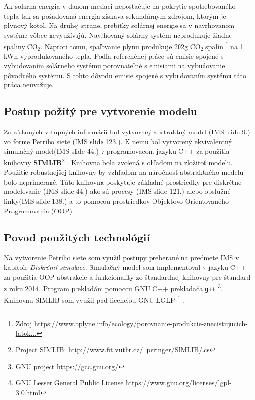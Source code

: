 \documentclass[a4paper, 11pt]{article}
\begin{document}
Ak solárna energia v danom mesiaci nepostačuje na pokrytie spotrebovaného tepla tak sa požadovaná energia získava sekundárnym zdrojom, ktorým je plynový kotol. Na druhej strane, prebitky solárnej energie sa v navrhovanom systéme vôbec nevyužívajú. Navrhovaný solárny systém neprodukuje žiadne spaliny CO$_2$. Naproti tomu, spaľovanie plynu produkuje 202g CO$_2$ spalín \footnote{Zdroj \href{https://www.oplyne.info/ecology/porovnanie-produkcie-znecistujucich-latok-so2-tzl-nox-co-a-sklenikoveho-plynu-co2-vyprodukovanych-spalinami-v-rodinnom-dome-vykurovanie-drevom-ciernym-hnedym-uhlim-a-zemnym-plynom/}{https://www.oplyne.info/ecology/porovnanie-produkcie-znecistujucich-latok...}}  na 1 kWh vyprodukovaného tepla. Podľa referenčnej práce sú emisie spojené s vybudovaním solárneho systému porovnateľné s emisiami na vybudovanie pôvodného systému. S tohto dôvodu emisie spojené s vybudovaním systému táto práca neuvažuje. 

\subsection{Postup požitý pre vytvorenie modelu}

Zo získaných vstupných informácií bol vytvorneý abstraktný model (IMS\cite{ims_slides} slide 9.) vo forme Petriho siete (IMS\cite{ims_slides} slide 123.). K nemu bol vytvorený ekvivalentný simulačný model(IMS\cite{ims_slides} slide 44.) v programovacom jazyku C++ za použitia knihovny \textbf{SIMLIB}\footnote{Project SIMLIB: \href{http://www.fit.vutbr.cz/~peringer/SIMLIB/.cs}{http://www.fit.vutbr.cz/~peringer/SIMLIB/.cs}} . Knihovna bola zvolená s ohľadom na zložitoť modelu. Použitie robustnejšej knihovny by vzhľadom na náročnosť abstraktného modelu bolo neprimerané. Táto knihovna poskytuje základné prostriedky pre diskrétne modelovanie (IMS\cite{ims_slides} slide 44.) ako sú procesy (IMS\cite{ims_slides} slide 121.) alebo obslužné linky(IMS\cite{ims_slides} slide 138.) a to pomocou prostriedkov Objektovo Orientovaného Programovania (OOP).

\subsection{Povod použitých technológií}
Na vytvorenie Petriho sieťe som využil postupy preberané na predmete IMS\cite{ims_slides} v kapitole \textit{Diskrétní simulace}. Simulačný model som implementoval v jazyku C++ za použitia OOP abstrakcie a funkcionality zo štandardnej knihovny pre štandard z roku 2014. Program prekladám pomocou GNU C++ prekladača \texttt{g++} \footnote{GNU project \href{https://gcc.gnu.org/}{https://gcc.gnu.org/}}. Knihovnu SIMLIB  som využil pod licenciou GNU LGLP \footnote{GNU Lesser General Public License \href{https://www.gnu.org/licenses/lgpl-3.0.html}{https://www.gnu.org/licenses/lgpl-3.0.html}} . 
\end{document}
